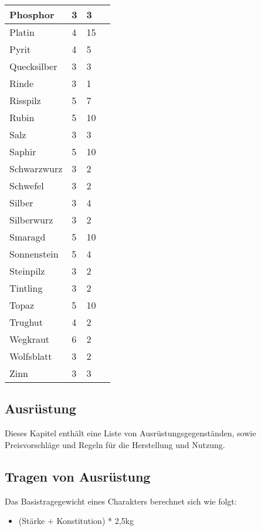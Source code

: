 \documentclass{article}
\begin{document}
\begin{small}
\begin{tabular}{|m{3cm}|m{3cm}|m{4cm}|m{6cm}|}
\hline
Phosphor&3&3& \\
\hline
Platin&4&15& \\
\hline
Pyrit&4&5& \\
\hline
Quecksilber&3&3& \\
\hline
Rinde&3&1& \\
\hline
Risspilz&5&7& \\
\hline
Rubin&5&10& \\
\hline
Salz&3&3& \\
\hline
Saphir&5&10& \\
\hline
Schwarzwurz&3&2& \\
\hline
Schwefel&3&2& \\
\hline
Silber&3&4& \\
\hline
Silberwurz&3&2& \\
\hline
Smaragd&5&10& \\
\hline
Sonnenstein&5&4& \\
\hline
Steinpilz&3&2& \\
\hline
Tintling&3&2& \\
\hline
Topaz&5&10& \\
\hline
Trughut&4&2& \\
\hline
Wegkraut&6&2& \\
\hline
Wolfsblatt&3&2& \\
\hline
Zinn&3&3& \\
\hline
\end{tabular}
\end{small}

\newpage

\begin{center}
\section{Ausrüstung}
\end{center}

Dieses Kapitel enthält eine Liste von Ausrüstungsgegenständen, sowie Preisvorschläge und Regeln für die Herstellung
und Nutzung.

\begin{center}
\subsection{Tragen von Ausrüstung}
\end{center}

Das Basistragegewicht eines Charakters berechnet sich wie folgt:

\begin{itemize}
\item (Stärke + Konstitution) * 2,5kg
\end{itemize}
\end{document}
